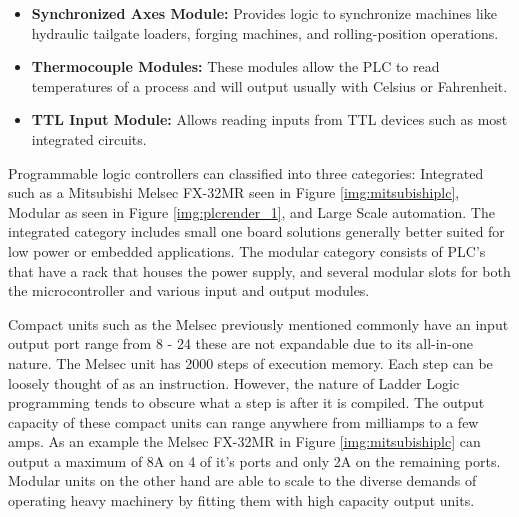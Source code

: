\begin{itemize}
	\item \textbf{Synchronized Axes Module:} Provides logic to synchronize machines like hydraulic tailgate loaders, forging machines, and rolling-position operations.
	\item \textbf{Thermocouple Modules:} These modules allow the PLC to read temperatures of a process and will output usually with Celsius or Fahrenheit.
	\item \textbf{TTL Input Module:} Allows reading inputs from TTL devices such as most integrated circuits.
\end{itemize}

Programmable logic controllers can classified into three categories: Integrated such as a Mitsubishi Melsec FX-32MR seen in Figure \ref{img:mitsubishiplc}, Modular as seen in Figure \ref{img:plcrender_1}, and Large Scale automation. The integrated category includes small one board solutions generally better suited for low power or embedded applications. The modular category consists of PLC's that have a rack that houses the power supply, and several modular slots for both the microcontroller and various input and output modules.

Compact units such as the Melsec previously mentioned commonly have an input output port range from 8 - 24 these are not expandable due to its all-in-one nature. The Melsec unit has 2000 steps of execution memory. Each step can be loosely thought of as an instruction. However, the nature of Ladder Logic programming tends to obscure what a step is after it is compiled. The output capacity of these compact units can range anywhere from milliamps to a few amps. As an example the Melsec FX-32MR in Figure \ref{img:mitsubishiplc} can output a maximum of 8A on 4 of it's ports and only 2A on the remaining ports. Modular units on the other hand are able to scale to the diverse demands of operating heavy machinery by fitting them with high capacity output units.

